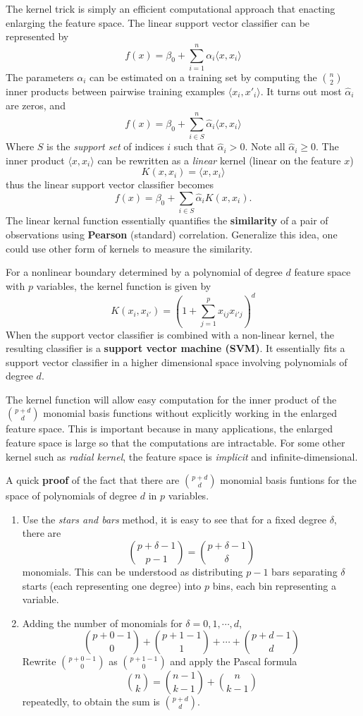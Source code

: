 \documentclass[
  letterpaper,
  DIV=11,
  numbers=noendperiod]{scrreprt}
\providecommand{\tightlist}{%
  \setlength{\itemsep}{0pt}\setlength{\parskip}{0pt}}\usepackage{longtable,booktabs,array}
\begin{document}
The kernel trick is simply an efficient computational approach that
enacting enlarging the feature space. The linear support vector
classifier can be represented by \[
f(x)=\beta_0+ \sum_{i=1}^n \alpha_i \langle x, x_i \rangle 
\] The parameters \(\alpha_i\) can be estimated on a training set by
computing the \(n \choose 2\) inner products between pairwise training
examples \(\langle x_i, x'_i \rangle\). It turns out most
\(\hat{\alpha}_i\) are zeros, and \[
f(x)=\beta_0+ \sum_{i\in S}^n \hat{\alpha}_i \langle x, x_i \rangle 
\] Where \(S\) is the \emph{support set} of indices \(i\) such that
\(\hat{\alpha}_i>0\). Note all \(\hat{\alpha}_i\ge 0\). The inner
product \(\langle x, x_i \rangle\) can be rewritten as a \emph{linear}
kernel (linear on the feature \(x\))\\
\[
K(x,x_i)=\langle x,x_i  \rangle 
\] thus the linear support vector classifier becomes \[
f(x) = \beta_0 + \sum_{i\in S} \hat{\alpha}_i K(x, x_i). 
\] The linear kernal function essentially quantifies the
\textbf{similarity} of a pair of observations using \textbf{Pearson}
(standard) correlation. Generalize this idea, one could use other form
of kernels to measure the similarity.

For a nonlinear boundary determined by a polynomial of degree \(d\)
feature space with \(p\) variables, the kernel function is given by \[
K(x_i, x_{i'}) = \left( 1+ \sum_{j=1}^p x_{ij}x_{i'j}  \right)^d
\] When the support vector classifier is combined with a non-linear
kernel, the resulting classifier is a \textbf{support vector machine
(SVM)}. It essentially fits a support vector classifier in a higher
dimensional space involving polynomials of degree \(d\).

The kernel function will allow easy computation for the inner product of
the \(p+d \choose d\) monomial basis functions without explicitly
working in the enlarged feature space. This is important because in many
applications, the enlarged feature space is large so that the
computations are intractable. For some other kernel such as \emph{radial
kernel}, the feature space is \emph{implicit} and infinite-dimensional.

A quick \textbf{proof} of the fact that there are \(p+d \choose d\)
monomial basis funtions for the space of polynomials of degree \(d\) in
\(p\) variables.

\begin{enumerate}
\def\labelenumi{\arabic{enumi}.}
\tightlist
\item
  Use the \emph{stars and bars} method, it is easy to see that for a
  fixed degree \(\delta\), there are
  \[{p+\delta-1 \choose p-1} = {p +\delta -1 \choose \delta}\]
  monomials. This can be understood as distributing \(p-1\) bars
  separating \(\delta\) starts (each representing one degree) into \(p\)
  bins, each bin representing a variable.
\item
  Adding the number of monomials for \(\delta=0, 1, \cdots, d\), \[
  {p+0-1 \choose 0 } + {p+1-1 \choose 1 }+\cdots +{p+d-1 \choose d }
  \] Rewrite \({p+0-1 \choose 0 }\) as \({p+1-1 \choose 0 }\) and apply
  the Pascal formula \[
  {n \choose k}= {n-1 \choose k-1} + {n \choose k-1}
  \] repeatedly, to obtain the sum is \({p+d \choose d}\).
\end{enumerate}
\end{document}
